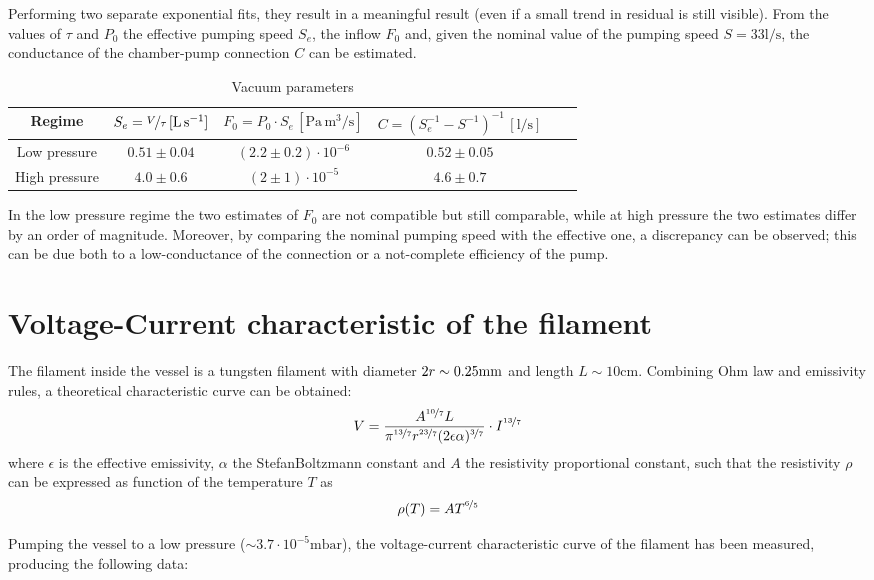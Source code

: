 \documentclass[11pt,a4 paper]{article}
\let\oldfrac\frac
\renewcommand{\frac}[3][d]{\ifthenelse{\equal{#1}{d}}{\oldfrac{#2}{#3}}{\nicefrac{#2}{#3}}}
\begin{document}
Performing two separate exponential fits, they result in a meaningful result (even if a small trend in residual is still visible). From the values of $\tau$ and $P_0$ the effective pumping speed $S_e$, the inflow $F_0$ and, given the nominal value of the pumping speed $S = 33 \si{\litre/\second}$, the conductance of the chamber-pump connection $C$ can be estimated.

\begin{table}[H]
  \centering
  \begin{tabular}{cccccc}
    \toprule
    Regime & $S_e = \frac[f]{V}{\tau}\,[\si{\litre\per\second}]$ & $F_0 = P_0 \cdot S_e\,[\si{\pascal\,\metre^3\per\second}]$ & $C = (S_e^{-1} - S^{-1})^{-1}\,[\si{\litre\per\second}]$ \\
    \midrule
    Low pressure & $0.51 \pm 0.04$ & $(2.2 \pm 0.2)\cdot 10^{-6}$ & $0.52 \pm 0.05$ \\
    High pressure & $4.0 \pm 0.6$ & $(2 \pm 1)\cdot 10^{-5}$ & $4.6 \pm 0.7$ \\
    \bottomrule
  \end{tabular}
  \caption{Vacuum parameters}
  \label{tab:vacuum}
\end{table}

In the low pressure regime the two estimates of $F_0$ are not compatible but still comparable, while at high pressure the two estimates differ by an order of magnitude. Moreover, by comparing the nominal pumping speed with the effective one, a discrepancy can be observed; this can be due both to a low-conductance of the connection or a not-complete efficiency of the pump.

\section{Voltage-Current characteristic of the filament}
The filament inside the vessel is a tungsten filament with diameter $2r\sim0.25\si{{\milli\metre}}$ and length $L\sim10\si{\centi\metre}$. Combining Ohm law and emissivity rules, a theoretical characteristic curve can be obtained:
\[
    V = \frac{A^{\frac[f]{10}{7}}L}{\pi^{\frac[f]{13}{7}}r^{\frac[f]{23}{7}}(2\epsilon\alpha)^{\frac[f]{3}{7}}} \cdot I^{\frac[f]{13}{7}}
\]
where $\epsilon$ is the effective emissivity, $\alpha$ the StefanBoltzmann constant and $A$ the resistivity proportional constant, such that the resistivity $\rho$ can be expressed as function of the temperature $T$ as
\[
    \rho(T) = AT^{\frac[f]{6}{5}}
\]

Pumping the vessel to a low pressure ($\sim 3.7\cdot10^{-5}\si{\milli\bar}$), the voltage-current characteristic curve of the filament has been measured, producing the following data:
\end{document}

